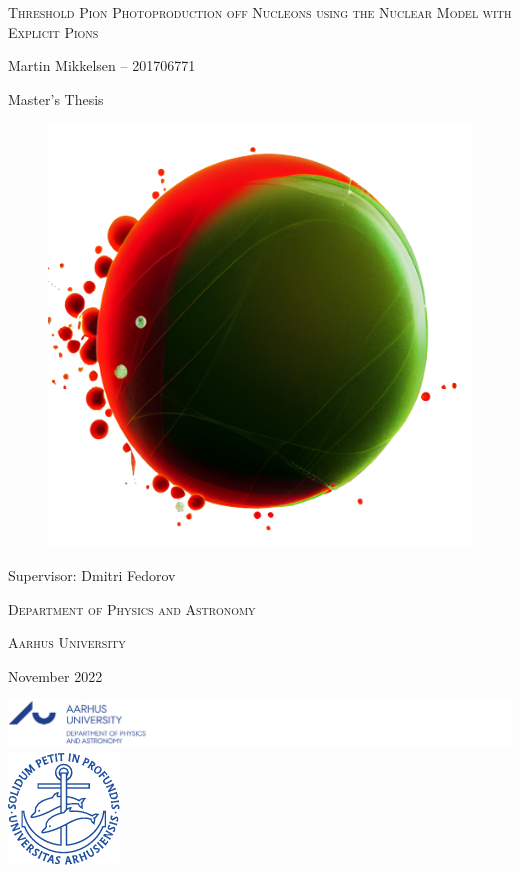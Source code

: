 \documentclass[a4paper, 12pt]{memoir}
\newcommand{\projecttitle}{Threshold Pion Photoproduction off Nucleons using the Nuclear Model with Explicit Pions}
\newcommand{\projectauthor}{Martin Mikkelsen }
\newcommand{\projectauthorID}{201706771}
\newcommand{\projectsupervisor}{Dmitri Fedorov}
\newcommand{\projectdate}{November 2022}
\newcommand{\projectdepartment}{Department of Physics and Astronomy}
\newcommand{\projectuniversity}{Aarhus University}
\begin{document}
\begin{titlingpage}
\begin{center}
	
	\fontsize{26pt}{29pt}\selectfont
	
	\textsc{\projecttitle} \par
	
	\vspace{0.75cm}
	
	\fontsize{20pt}{24pt}\selectfont
	
	\projectauthor -- 
	\projectauthorID \par
	\vspace{0.5cm}
	
	\fontsize{16pt}{16pt}\selectfont
	Master's Thesis
	
	\vspace{0.2cm}
	\begin{center}
	\begin{figure}[H]
		\centering
		\hspace*{0cm}
		\includegraphics[width=0.55\linewidth]{Pion-NucleonSystem.png}
		\label{fig:pion-nucleonsystem}
	\end{figure}
\end{center}
	\vspace{0.2cm}
	
	\fontsize{20pt}{24pt}\selectfont
	 Supervisor: \projectsupervisor \par
	
	\vspace{1cm}
	
	\fontsize{18pt}{22pt}\selectfont
	
	\textsc{\projectdepartment} \par
	\textsc{\projectuniversity} \par
	
	\vspace{1cm}
	
	\projectdate
\end{center}
\vfill
\noindent
\includegraphics{Logo_Department_en}
\hfill
\includegraphics{segla1b}
\end{titlingpage}
\end{document}
